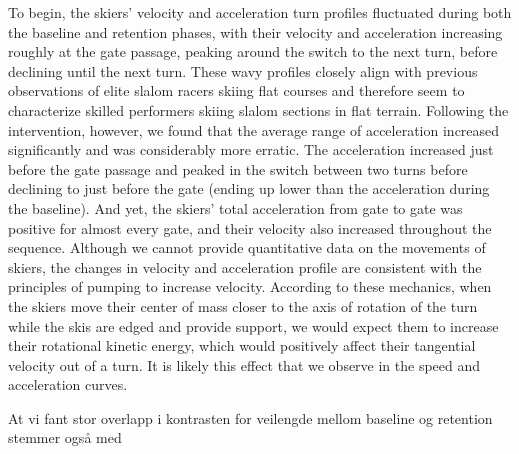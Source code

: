 \documentclass{article}
\begin{document}
To begin, the skiers' velocity and acceleration turn profiles fluctuated during both the baseline and retention phases, with their velocity and acceleration increasing roughly at the gate passage, peaking around the switch to the next turn, before declining until the next turn. These wavy profiles closely align with previous observations of elite slalom racers skiing flat courses \cite{supej_impact_2015} and therefore seem to characterize skilled performers skiing slalom sections in flat terrain. Following the intervention, however, we found that the average range of acceleration increased significantly and was considerably more erratic. The acceleration increased just before the gate passage and peaked in the switch between two turns before declining to just before the gate (ending up lower than the acceleration during the baseline). And yet, the skiers' total acceleration from gate to gate was positive for almost every gate, and their velocity also increased throughout the sequence. Although we cannot provide quantitative data on the movements of skiers, the changes in velocity and acceleration profile are consistent with the principles of pumping to increase velocity. According to these mechanics, when the skiers move their center of mass closer to the axis of rotation of the turn while the skis are edged and provide support, we would expect them to increase their rotational kinetic energy, which would positively affect their tangential velocity out of a turn. It is likely this effect that we observe in the speed and acceleration curves.

At vi fant stor overlapp i kontrasten for veilengde mellom baseline og retention stemmer også med 
\end{document}
